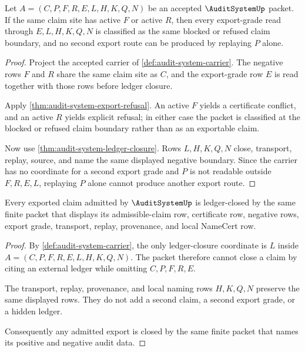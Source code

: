 \begin{theorem}
\label{thm:audit-system-certificate-conflict-determinacy}
Let $A=(C,P,F,R,E,L,H,K,Q,N)$ be an accepted $\AuditSystemUp$ packet. If the same claim site has active $F$ or active $R$, then every export-grade read through $E,L,H,K,Q,N$ is classified as the same blocked or refused claim boundary, and no second export route can be produced by replaying $P$ alone.
\end{theorem}
\begin{proof}
Project the accepted carrier of \autoref{def:audit-system-carrier}. The negative rows $F$ and $R$ share the same claim site as $C$, and the export-grade row $E$ is read together with those rows before ledger closure.

Apply \autoref{thm:audit-system-export-refusal}. An active $F$ yields a certificate conflict, and an active $R$ yields explicit refusal; in either case the packet is classified at the blocked or refused claim boundary rather than as an exportable claim.

Now use \autoref{thm:audit-system-ledger-closure}. Rows $L,H,K,Q,N$ close, transport, replay, source, and name the same displayed negative boundary. Since the carrier has no coordinate for a second export grade and $P$ is not readable outside $F,R,E,L$, replaying $P$ alone cannot produce another export route.
\end{proof}

\begin{theorem}
\label{thm:audit-system-ledger-closure}
Every exported claim admitted by $\AuditSystemUp$ is ledger-closed by the same finite packet that displays its admissible-claim row, certificate row, negative rows, export grade, transport, replay, provenance, and local NameCert row.
\end{theorem}
\begin{proof}
By \autoref{def:audit-system-carrier}, the only ledger-closure coordinate is $L$ inside $A=(C,P,F,R,E,L,H,K,Q,N)$. The packet therefore cannot close a claim by citing an external ledger while omitting $C,P,F,R,E$.

The transport, replay, provenance, and local naming rows $H,K,Q,N$ preserve the same displayed rows. They do not add a second claim, a second export grade, or a hidden ledger.

Consequently any admitted export is closed by the same finite packet that names its positive and negative audit data.
\end{proof}

